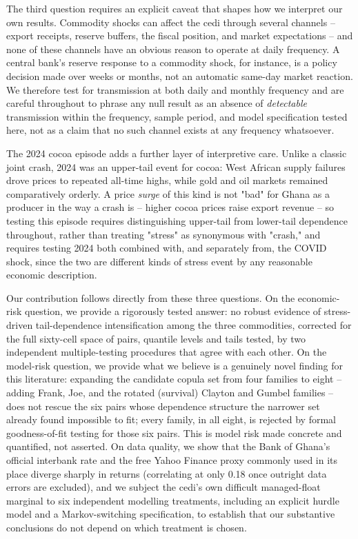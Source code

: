 \documentclass[final,3p,times,authoryear]{elsarticle}
\begin{document}
The third question requires an explicit caveat that shapes how we
interpret our own results. Commodity shocks can affect the cedi through
several channels -- export receipts, reserve buffers, the fiscal
position, and market expectations -- and none of these channels have an
obvious reason to operate at daily frequency. A central bank's reserve
response to a commodity shock, for instance, is a policy decision made
over weeks or months, not an automatic same-day market reaction. We
therefore test for transmission at both daily and monthly frequency and
are careful throughout to phrase any null result as an absence of
\emph{detectable} transmission within the frequency, sample period, and
model specification tested here, not as a claim that no such channel
exists at any frequency whatsoever.

The 2024 cocoa episode adds a further layer of interpretive care. Unlike
a classic joint crash, 2024 was an upper-tail event for cocoa: West
African supply failures drove prices to repeated all-time highs, while
gold and oil markets remained comparatively orderly. A price
\emph{surge} of this kind is not "bad" for Ghana as a producer in the
way a crash is -- higher cocoa prices raise export revenue -- so testing
this episode requires distinguishing upper-tail from lower-tail
dependence throughout, rather than treating "stress" as synonymous with
"crash," and requires testing 2024 both combined with, and separately
from, the COVID shock, since the two are different kinds of stress event
by any reasonable economic description.

Our contribution follows directly from these three questions. On the
economic-risk question, we provide a rigorously tested answer: no robust
evidence of stress-driven tail-dependence intensification among the
three commodities, corrected for the full sixty-cell space of pairs,
quantile levels and tails tested, by two independent multiple-testing
procedures that agree with each other. On the model-risk question, we
provide what we believe is a genuinely novel finding for this
literature: expanding the candidate copula set from four families to
eight -- adding Frank, Joe, and the rotated (survival) Clayton and
Gumbel families -- does not rescue the six pairs whose dependence
structure the narrower set already found impossible to fit; every
family, in all eight, is rejected by formal goodness-of-fit testing for
those six pairs. This is model risk made concrete and quantified, not
asserted. On data quality, we show that the Bank of Ghana's official
interbank rate and the free Yahoo Finance proxy commonly used in its
place diverge sharply in returns (correlating at only 0.18 once outright
data errors are excluded), and we subject the cedi's own difficult
managed-float marginal to six independent modelling treatments,
including an explicit hurdle model and a Markov-switching specification,
to establish that our substantive conclusions do not depend on which
treatment is chosen.
\end{document}
